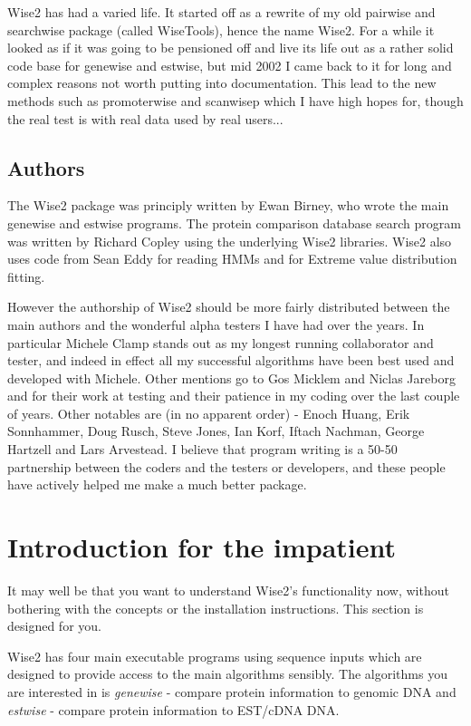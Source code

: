 \documentclass{article}
\begin{document}
Wise2 has had a varied life. It started off as a rewrite of my old
pairwise and searchwise package (called WiseTools), hence the name
Wise2. For a while it looked as if it was going to be pensioned off
and live its life out as a rather solid code base for genewise and
estwise, but mid 2002 I came back to it for long and complex reasons
not worth putting into documentation. This lead to the new methods
such as promoterwise and scanwisep which I have high hopes for, though
the real test is with real data used by real users...

\subsection{Authors}

The Wise2 package was principly written by Ewan Birney, who wrote the
main genewise and estwise programs. The protein comparison database
search program was written by Richard Copley using the underlying
Wise2 libraries. Wise2 also uses code from Sean Eddy for reading HMMs
and for Extreme value distribution fitting.

However the authorship of Wise2 should be more fairly distributed
between the main authors and the wonderful alpha testers I have had
over the years. In particular Michele Clamp stands out as my longest
running collaborator and tester, and indeed in effect all my
successful algorithms have been best used and developed with
Michele. Other mentions go to Gos Micklem and Niclas Jareborg and
for their work at testing and their patience in my coding over the
last couple of years. Other notables are (in no apparent order) -
Enoch Huang, Erik Sonnhammer, Doug Rusch, Steve Jones, Ian Korf,
Iftach Nachman, George Hartzell and Lars Arvestead. I believe that
program writing is a 50-50 partnership between the coders and the
testers or developers, and these people have actively helped me make a
much better package. 


\newpage
\section{Introduction for the impatient}

It may well be that you want to understand Wise2's functionality now,
without bothering with the concepts or the installation instructions.
This section is designed for you.

Wise2 has four main executable programs using sequence inputs which
are designed to provide access to the main algorithms sensibly. The
algorithms you are interested in is \emph{genewise} - compare protein
information to genomic DNA and \emph{estwise} - compare protein 
information to EST/cDNA DNA.
\end{document}

